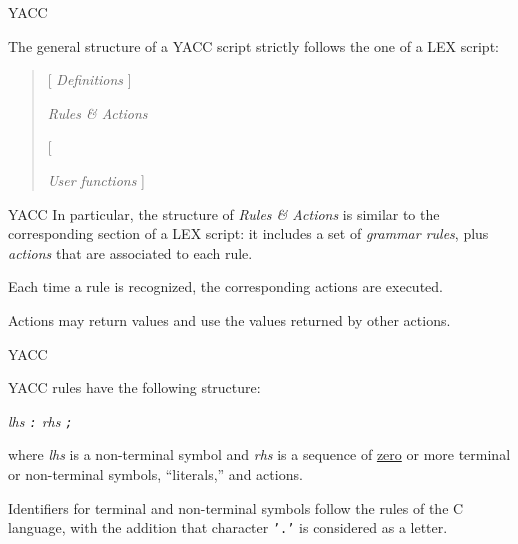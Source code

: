 \begin{frame}[fragile]{YACC}

The general structure of a YACC script
strictly follows the one of a LEX script:


\vspace{20pt}

\begin{quote}
[ {\em Definitions\/} ]

\pcpc

{\em Rules \& Actions}

[ \pcpc

{\em User functions\/} ]
\end{quote}

\end{frame}
\begin{frame}[fragile]{YACC}
In particular, the structure of {\em Rules \& Actions\/}
is similar to the corresponding section of a LEX script:
it includes a set of \emph{grammar rules}, plus  \emph{actions\/}
that are associated to each rule.


\vspace{20pt}

Each time a rule is recognized, the corresponding actions are executed.


\vspace{20pt}

Actions may return values and use the values returned by other actions.

\end{frame}
\begin{frame}[fragile]{YACC}

YACC rules have the following structure:
\begin{center}\em lhs {\tt :} rhs {\tt ;}
\end{center}


\vspace{20pt}

where {\em lhs\/} is a non-terminal symbol and {\em rhs\/}
is a sequence of 
\underline{zero} or more terminal or non-terminal symbols,
``literals,'' and actions.


\vspace{20pt}

Identifiers for terminal and non-terminal symbols follow the
rules of the C language, with the addition that character
{\tt '.'} is considered as a letter.


\end{frame}
